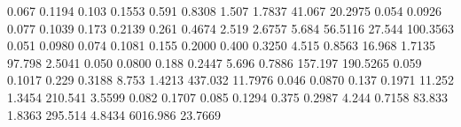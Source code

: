 0.067     0.1194    %
0.103     0.1553    %
0.591     0.8308    %
1.507     1.7837    %
41.067    20.2975   %
0.054     0.0926    %
0.077     0.1039    %
0.173     0.2139    %
0.261     0.4674    %
2.519     2.6757    %
5.684     56.5116   %
27.544    100.3563  %
0.051     0.0980    %
0.074     0.1081    %
0.155     0.2000    %
0.400     0.3250    %
4.515     0.8563    %
16.968    1.7135    %
97.798    2.5041    %
0.050     0.0800    %
0.188     0.2447    %
5.696     0.7886    %
157.197   190.5265  %
0.059     0.1017    %
0.229     0.3188    %
8.753     1.4213    %
437.032   11.7976   %
0.046     0.0870    %
0.137     0.1971    %
11.252    1.3454    %
210.541   3.5599    %
0.082     0.1707    %
0.085     0.1294    %
0.375     0.2987    %
4.244     0.7158    %
83.833    1.8363    %
295.514   4.8434    %
6016.986  23.7669   %
